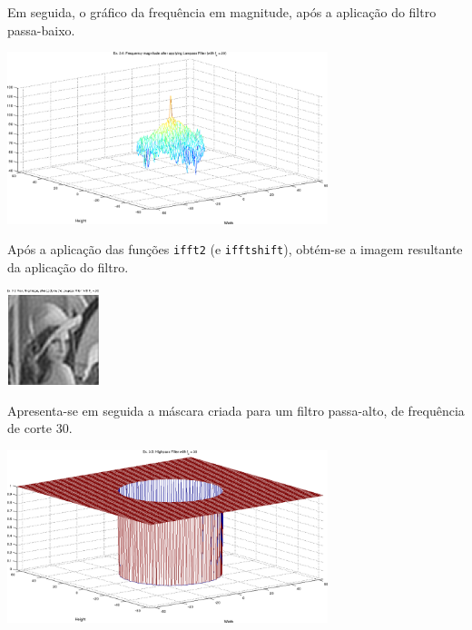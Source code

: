 \documentclass[a4paper]{article}
\begin{document}
\noindent Em seguida, o gráfico da frequência em magnitude, após a aplicação do filtro passa-baixo.
\begin{center}
	\includegraphics[width=0.70\textwidth]{images/ex_3_6_lowpass.png}
	\label{fig:ex_3_6_lowpass}
\end{center}

\clearpage

\noindent Após a aplicação das funções \texttt{ifft2} (e \texttt{ifftshift}), obtém-se a imagem resultante da aplicação do filtro.
\begin{center}
	\includegraphics[width=0.20\textwidth]{images/ex_3_8_lowpass.png}
	\label{fig:ex_3_8_lowpass}
\end{center}

\clearpage

\noindent Apresenta-se em seguida a máscara criada para um filtro passa-alto, de frequência de corte $30$.
\begin{center}
	\includegraphics[width=0.70\textwidth]{images/ex_3_5_highpass.png}
	\label{fig:ex_3_5_highpass}
\end{center}
\end{document}
